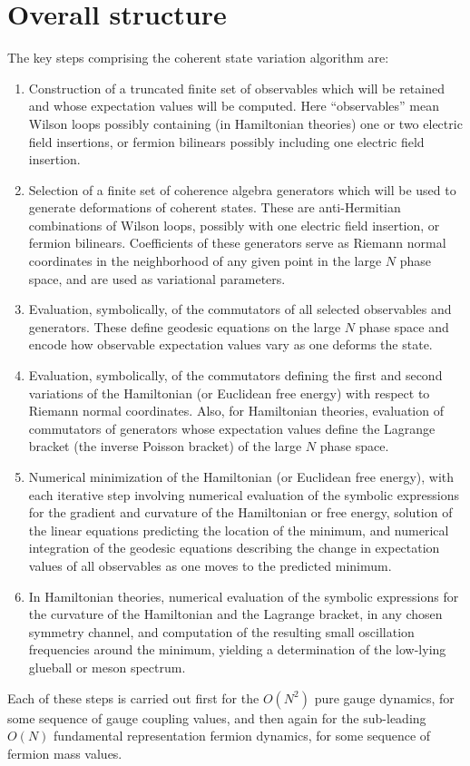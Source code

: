 \documentclass [12pt]{article}
\begin{document}
\section {Overall structure}

The key steps comprising the coherent state variation algorithm
\cite {CSVAII} are:
\begin{enumerate}\advance\itemsep -6pt
\item
    Construction of a truncated finite set of observables 
    which will be retained and whose expectation values will be computed.
    Here ``observables'' mean Wilson loops possibly containing
    (in Hamiltonian theories) one or two electric field insertions,
    or fermion bilinears possibly including one electric field insertion.
\item
    Selection of a finite set of coherence algebra generators
    which will be used to generate deformations of coherent states.
    These are anti-Hermitian combinations of Wilson loops,
    possibly with one electric field insertion, or fermion bilinears.
    Coefficients of these generators serve as Riemann normal coordinates
    in the neighborhood of any given point
    in the large $N$ phase space, and are used as variational parameters.
\item
    Evaluation, symbolically, of the commutators of all selected observables
    and generators.  These define geodesic equations
    on the large $N$ phase space and encode how observable expectation
    values vary as one deforms the state.
\item
    Evaluation, symbolically, of the commutators defining the first and second
    variations of the Hamiltonian (or Euclidean free energy) with respect
    to Riemann normal coordinates.
    Also, for Hamiltonian theories,
    evaluation of commutators of generators whose expectation values
    define the Lagrange bracket (the inverse Poisson bracket)
    of the large $N$ phase space.
\item
    Numerical minimization of the Hamiltonian (or Euclidean
    free energy), with each iterative step
    involving numerical evaluation of the symbolic expressions
    for the gradient and curvature of the Hamiltonian or free energy,
    solution of the linear equations predicting the location of the minimum,
    and numerical integration of the geodesic equations describing
    the change in expectation values of all observables as one moves
    to the predicted minimum.
\item
    In Hamiltonian theories,
    numerical evaluation of the symbolic expressions for the curvature of the
    Hamiltonian and the Lagrange bracket, in any chosen symmetry channel,
    and computation of the resulting
    small oscillation frequencies around the minimum,
    yielding a determination of the
    low-lying glueball or meson spectrum.
\end{enumerate}
%
Each of these steps is carried out first for the $O(N^2)$ pure gauge dynamics,
for some sequence of gauge coupling values,
and then again for the sub-leading $O(N)$ fundamental representation
fermion dynamics, for some sequence of fermion mass values.
\end{document}
